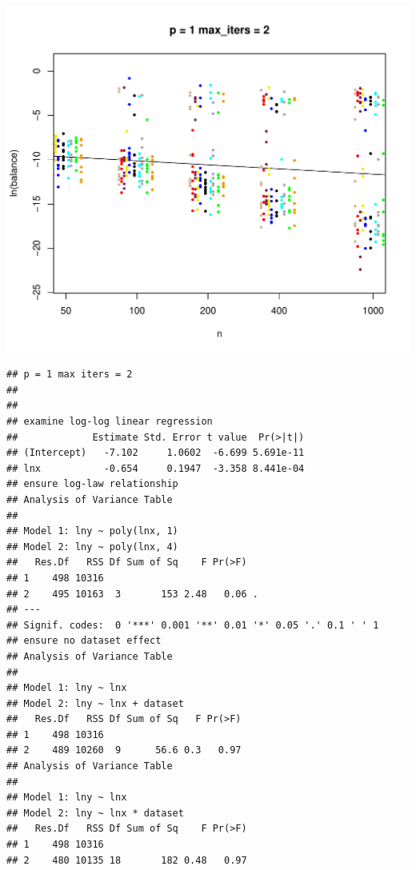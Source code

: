 \documentclass{article}\usepackage[]{graphicx}\usepackage[]{color}
\makeatletter
\def\maxwidth{ %
  \ifdim\Gin@nat@width>\linewidth
    \linewidth
  \else
    \Gin@nat@width
  \fi
}
\newenvironment{kframe}{%
 \def\at@end@of@kframe{}%
 \ifinner\ifhmode%
  \def\at@end@of@kframe{\end{minipage}}%
  \begin{minipage}{\columnwidth}%
 \fi\fi%
 \def\FrameCommand##1{\hskip\@totalleftmargin \hskip-\fboxsep
 \colorbox{shadecolor}{##1}\hskip-\fboxsep
     \hskip-\linewidth \hskip-\@totalleftmargin \hskip\columnwidth}%
 \MakeFramed {\advance\hsize-\width
   \@totalleftmargin\z@ \linewidth\hsize
   \@setminipage}}%
 {\par\unskip\endMakeFramed%
 \at@end@of@kframe}
\newenvironment{knitrout}{}{} %
\makeatother
\begin{document}
\begin{knitrout}
\includegraphics[width=\maxwidth]{figure/load_and_cleanup_data5} 
\begin{kframe}\begin{verbatim}
## p = 1 max iters = 2 
## 
## 
## examine log-log linear regression
##             Estimate Std. Error t value  Pr(>|t|)
## (Intercept)   -7.102     1.0602  -6.699 5.691e-11
## lnx           -0.654     0.1947  -3.358 8.441e-04
## ensure log-law relationship
## Analysis of Variance Table
## 
## Model 1: lny ~ poly(lnx, 1)
## Model 2: lny ~ poly(lnx, 4)
##   Res.Df   RSS Df Sum of Sq    F Pr(>F)  
## 1    498 10316                           
## 2    495 10163  3       153 2.48   0.06 .
## ---
## Signif. codes:  0 '***' 0.001 '**' 0.01 '*' 0.05 '.' 0.1 ' ' 1
## ensure no dataset effect
## Analysis of Variance Table
## 
## Model 1: lny ~ lnx
## Model 2: lny ~ lnx + dataset
##   Res.Df   RSS Df Sum of Sq   F Pr(>F)
## 1    498 10316                        
## 2    489 10260  9      56.6 0.3   0.97
## Analysis of Variance Table
## 
## Model 1: lny ~ lnx
## Model 2: lny ~ lnx * dataset
##   Res.Df   RSS Df Sum of Sq    F Pr(>F)
## 1    498 10316                         
## 2    480 10135 18       182 0.48   0.97
\end{verbatim}
\end{kframe}

\end{knitrout}
\end{document}
